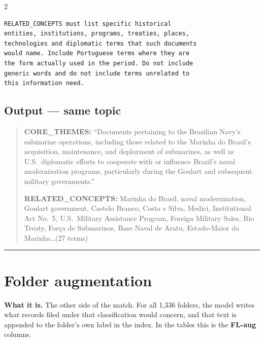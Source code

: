 \documentclass[a4paper,11pt]{article}
\newcommand{\partrule}{\vspace{2pt}\hrule\vspace{6pt}}
\begin{document}
\begin{multicols}{2}
{\begin{verbatim}
RELATED_CONCEPTS must list specific historical
entities, institutions, programs, treaties, places,
technologies and diplomatic terms that such documents
would name. Include Portuguese terms where they are
the form actually used in the period. Do not include
generic words and do not include terms unrelated to
this information need.
\end{verbatim}
}

\subsection*{Output --- same topic}

\begin{quote}
\textbf{CORE\_THEMES:} ``Documents pertaining to the Brazilian Navy's submarine operations,
including those related to the Marinha do Brasil's acquisition, maintenance, and deployment
of submarines, as well as U.S.\ diplomatic efforts to cooperate with or influence Brazil's
naval modernization programs, particularly during the Goulart and subsequent military
governments.''

\textbf{RELATED\_CONCEPTS:} Marinha do Brasil, naval modernization, Goulart government,
Castelo Branco, Costa e Silva, Medici, Institutional Act No.~5, U.S.\ Military Assistance
Program, Foreign Military Sales, Rio Treaty, For\c{c}a de Submarinos, Base Naval de Aratu,
Estado-Maior da Marinha\ldots (27 terms)
\end{quote}

\partrule

\section{Folder augmentation}

\textbf{What it is.} The other side of the match. For all 1{,}336 folders, the model writes what records filed under that classification
would concern, and that text is appended to the folder's own label in the index. In the tables
this is the
\textbf{FL-aug} columns.



\end{multicols}
\end{document}
